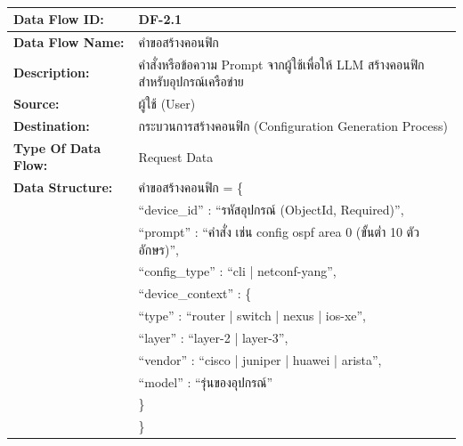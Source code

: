 
\begin{table}[H]
    \caption{}
    \label{tab:df-2-1}
    \fontSixTeen 
    \begin{tabularx}{\textwidth}{|l|L|} 
        \hline
        \textbf{Data Flow ID:} & DF-2.1 \\
        \hline
        \textbf{Data Flow Name:} & คำขอสร้างคอนฟิก \\
        \hline
        \textbf{Description:} & คำสั่งหรือข้อความ Prompt จากผู้ใช้เพื่อให้ LLM สร้างคอนฟิกสำหรับอุปกรณ์เครือข่าย \\
        \hline
        \textbf{Source:} & ผู้ใช้ (User) \\
        \hline
        \textbf{Destination:} & กระบวนการสร้างคอนฟิก (Configuration Generation Process) \\
        \hline
        \textbf{Type Of Data Flow:} & Request Data \\
        \hline
        \textbf{Data Structure:} & คำขอสร้างคอนฟิก = \{ \nonumber \\
                        & \hspace{1em} ``device\_id'' : ``รหัสอุปกรณ์ (ObjectId, Required)'', \nonumber \\
                        & \hspace{1em} ``prompt'' : ``คำสั่ง เช่น config ospf area 0 (ขั้นต่ำ 10 ตัวอักษร)'', \nonumber \\
                        & \hspace{1em} ``config\_type'' : ``cli | netconf-yang'', \nonumber \\
                        & \hspace{1em} ``device\_context'' : \{ \nonumber \\
                        & \hspace{2em} ``type'' : ``router | switch | nexus | ios-xe'', \nonumber \\
                        & \hspace{2em} ``layer'' : ``layer-2 | layer-3'', \nonumber \\
                        & \hspace{2em} ``vendor'' : ``cisco | juniper | huawei | arista'', \nonumber \\
                        & \hspace{2em} ``model'' : ``รุ่นของอุปกรณ์'' \nonumber \\
                        & \hspace{1em} \} \nonumber \\
                        & \} \\
        \hline
    \end{tabularx}
\end{table}

